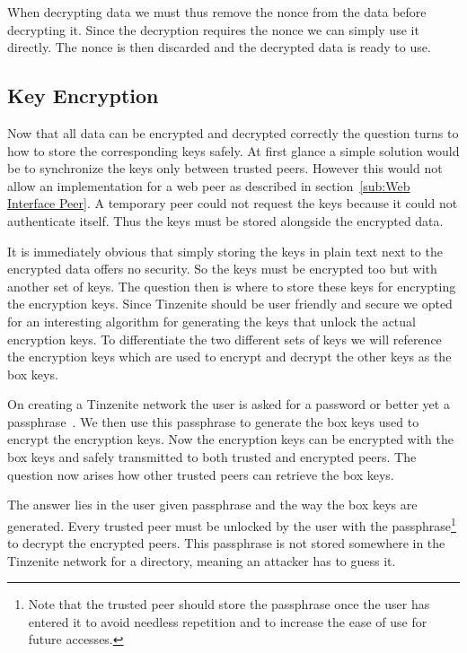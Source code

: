 When decrypting data we must thus remove the nonce from the data before decrypting it.
Since the decryption requires the nonce we can simply use it directly.
The nonce is then discarded and the decrypted data is ready to use.

\subsection{Key Encryption}
\label{sub:Key Encryption}

Now that all data can be encrypted and decrypted correctly the question turns to how to store the corresponding keys safely.
At first glance a simple solution would be to synchronize the keys only between trusted peers.
However this would not allow an implementation for a web peer as described in section~\ref{sub:Web Interface Peer}.
A temporary peer could not request the keys because it could not authenticate itself.
Thus the keys must be stored alongside the encrypted data.

It is immediately obvious that simply storing the keys in plain text next to the encrypted data offers no security.
So the keys must be encrypted too but with another set of keys.
The question then is where to store these keys for encrypting the encryption keys.
Since Tinzenite should be user friendly and secure we opted for an interesting algorithm for generating the keys that unlock the actual encryption keys.
To differentiate the two different sets of keys we will reference the encryption keys which are used to encrypt and decrypt the other keys as the box keys.

On creating a Tinzenite network the user is asked for a password or better yet a passphrase~\cite{web:site:xkcd:pwd_strength}.
We then use this passphrase to generate the box keys used to encrypt the encryption keys.
Now the encryption keys can be encrypted with the box keys and safely transmitted to both trusted and encrypted peers.
The question now arises how other trusted peers can retrieve the box keys.

The answer lies in the user given passphrase and the way the box keys are generated.
Every trusted peer must be unlocked by the user with the passphrase\footnote{Note that the trusted peer should store the passphrase once the user has entered it to avoid needless repetition and to increase the ease of use for future accesses.} to decrypt the encrypted peers.
This passphrase is not stored somewhere in the Tinzenite network for a directory, meaning an attacker has to guess it.

